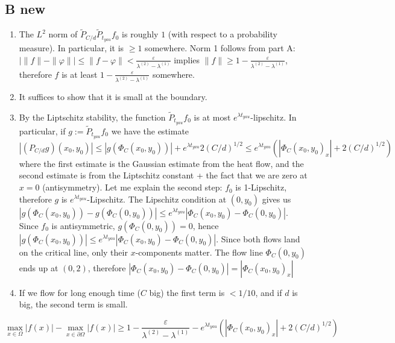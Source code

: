 \subsection{B new}
\begin{enumerate}
    \item  The $L^2$ norm of $\tilde P_{C/d}\tilde P_{t_{yau}} f_0$ is roughly $1$ (with respect to a probability measure). In particular, it is $\ge 1$ somewhere. Norm 1 follows from part A: \( |\|f\| - \|\varphi\|| \le \|f-\varphi\| < \frac{\varepsilon}{\lambda^{(2)}-\lambda^{(1)}} \) implies \( \|f\| \ge 1 - \frac{\varepsilon}{\lambda^{(2)}-\lambda^{(1)}} \), therefore \( f \) is at least \( 1 - \frac{\varepsilon}{\lambda^{(2)}-\lambda^{(1)}} \) somewhere.
    \item It suffices to show that it is small at the boundary.
    \item By the Liptschitz stability, the function $\tilde P_{t_{yau}} f_0$ is at most $e^{\lambda t_{yau}
    }$-lipschitz. In particular, if $g:=\tilde P_{t_{yau}} f_0$ we have the estimate
    $$
    |(P_{C/d} g)(x_0,y_0)| 
    \le |g(\Phi_C(x_0,y_0))|+e^{\lambda t_{yau}}2(C/d)^{1/2}
    \le e^{\lambda t_{yau}}(|\Phi_C(x_0,y_0)_x|+2(C/d)^{1/2})
    $$
    where the first estimate is the Gaussian estimate from the heat flow, and the second estimate is from the Liptschitz constant + the fact that we are zero at $x=0$ (antisymmetry). Let me explain the second step: \( f_0 \) is 1-Lipschitz, therefore \( g \) is \( e^{\lambda t_{yau}} \)-Lipschitz. The Lipschitz condition at \( (0, y_0) \) gives us \( |g(\Phi_C(x_0,y_0)) - g(\Phi_C(0,y_0))| \le  e^{\lambda t_{yau}}|\Phi_C(x_0,y_0) - \Phi_C(0,y_0)| \). Since \( f_0 \) is antisymmetric, \( g(\Phi_C(0,y_0)) = 0 \), hence \( |g(\Phi_C(x_0,y_0))| \le  e^{\lambda t_{yau}}|\Phi_C(x_0,y_0) - \Phi_C(0,y_0)| \). Since both flows land on the critical line, only their \( x \)-components matter. The flow line \( \Phi_C(0,y_0) \) ends up at \( (0, 2) \), therefore \( |\Phi_C(x_0,y_0) - \Phi_C(0,y_0)| = |\Phi_C(x_0,y_0)_x| \)
    \item If we flow for long enough time ($C$ big) the first term is $<1/10$, and if $d$ is big, the second term is small.
\end{enumerate}

\begin{equation*}
    \max_{x \in \Omega} |f(x)| - \max_{x \in \partial\Omega} |f(x)|
    \ge 1 -\frac{\varepsilon}{\lambda^{(2)}-\lambda^{(1)}} - e^{\lambda t_{yau}}(|\Phi_C(x_0,y_0)_x|+2(C/d)^{1/2})
\end{equation*}

